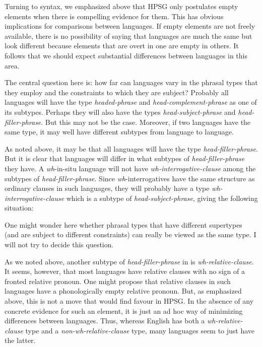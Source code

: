\documentclass[output=paper]{langsci/langscibook}
\begin{document}
Turning to syntax, we emphasized above that \gls{HPSG} only postulates empty elements
when there is compelling evidence for them. This has obvious implications for
comparisons between languages. If empty elements are not freely available,
there is no possibility of saying that languages are much the same but look
different because elements that are overt in one are empty in others. It
follows that we should expect substantial differences between languages in this
area.

The central question here is: how far can languages vary in the phrasal types
that they employ and the constraints to which they are subject? Probably all
languages will have the type \emph{headed-phrase} and
\emph{head-complement-phrase} as one of its subtypes. Perhaps they will also
have the types \emph{head-subject-phrase} and \emph{head-filler-phrase}. But
this may not be the case. Moreover, if two languages have the same type, it may
well have different subtypes from language to language.

As noted above, it may be that all languages will have the type
\emph{head-filler-phrase}. But it is clear that languages will differ in what
subtypes of \emph{head-filler-phrase} they have. A \emph{wh}-in-situ language
will not have \emph{wh-interrogative-clause} among the subtypes of
\emph{head-filler-phrase}. Since \emph{wh}-interrogatives have the same
structure as ordinary clauses in such languages, they will probably have a type
\emph{wh-interrogative-clause} which is a subtype of
\emph{head-subject-phrase}, giving the following situation:

\ea\label{ex:key:4.16}
\z
%
One might wonder here whether phrasal types that have different supertypes (and
are subject to different constraints) can really be viewed as the same type. I
will not try to decide this question.

As we noted above, another subtype of \emph{head-filler-phrase} in  is
\emph{wh-relative-clause}. It seems, however, that most languages have relative
clauses with no sign of a fronted relative pronoun. One might propose that
relative clauses in such languages have a phonologically empty relative
pronoun. But, as emphasized above, this is not a move that would find favour in
\gls{HPSG}. In the absence of any concrete evidence for such an element, it is
just an ad hoc way of minimizing differences between languages. Thus, whereas
English has both a \emph{wh-relative-clause} type and a
\emph{non-wh-relative-clause} type, many languages seem to just have the
latter.
\end{document}
